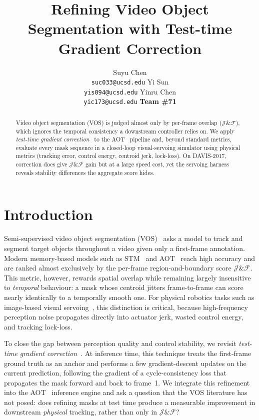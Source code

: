 \documentclass{article}
\title{Refining Video Object Segmentation with Test-time Gradient Correction}
\author{%
  Suyu Chen \\
  \texttt{suc033@ucsd.edu}
  \And
  Yi Sun \\
  \texttt{yis094@ucsd.edu}
  \And
  Yinru Chen\\
  \texttt{yic173@ucsd.edu}
  \AND
  \textbf{Team \#71}
}
\begin{document}
\maketitle

\begin{abstract}
Video object segmentation (VOS) is judged almost only by per-frame overlap ($\mathcal{J}\&\mathcal{F}$), 
which ignores the temporal consistency a downstream controller relies on. 
We apply \emph{test-time gradient correction}~\citep{li2020cycle} to the AOT~\citep{yang2021aot} pipeline and, 
beyond standard metrics, evaluate every mask sequence in a closed-loop visual-servoing simulator using physical metrics 
(tracking error, control energy, centroid jerk, lock-loss). 
On DAVIS-2017, correction does give $\mathcal{J}\&\mathcal{F}$ gain but at a large speed cost, 
yet the servoing harness reveals stability differences the aggregate score hides.
\end{abstract}

\section{Introduction}

Semi-supervised video object segmentation (VOS)~\citep{pont2017davis} asks a model to track and segment target objects throughout a video given only a first-frame annotation. Modern memory-based models such as STM~\citep{oh2019stm} and AOT~\citep{yang2021aot} reach high accuracy and are ranked almost exclusively by the per-frame region-and-boundary score $\mathcal{J}\&\mathcal{F}$. This metric, however, rewards spatial overlap while remaining largely insensitive to \emph{temporal} behaviour: a mask whose centroid jitters frame-to-frame can score nearly identically to a temporally smooth one. For physical robotics tasks such as image-based visual servoing~\citep{chaumette2006visual}, this distinction is critical, because high-frequency perception noise propagates directly into actuator jerk, wasted control energy, and tracking lock-loss.

To close the gap between perception quality and control stability, we revisit \emph{test-time gradient correction}~\citep{li2020cycle}. At inference time, this technique treats the first-frame ground truth as an anchor and performs a few gradient-descent updates on the current prediction, following the gradient of a cycle-consistency loss that propagates the mask forward and back to frame~1. We integrate this refinement into the AOT~\citep{yang2021aot} inference engine and ask a question that the VOS literature has not posed: does refining masks at test time produce a measurable improvement in downstream \emph{physical} tracking, rather than only in $\mathcal{J}\&\mathcal{F}$?
\end{document}
